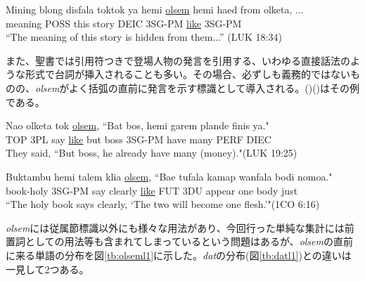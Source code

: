 \begin{exe}
  \ex\label{ex:olsemc}
  \gll Mining blong disfala toktok ya hemi \underline{olsem} hemi haed from olketa, ...\\
  meaning POSS this story DEIC 3SG-PM \underline{like} 3SG-PM \\
  \glt ``The meaning of this story is hidden from them...'' (LUK 18:34)
\end{exe}

また、聖書では引用符つきで登場人物の発言を引用する、いわゆる直接話法のような形式で台詞が挿入されることも多い。その場合、必ずしも義務的ではないものの、\textit{olsem}がよく括弧の直前に発言を示す標識として導入される。()()はその例である。

\begin{exe}
  \ex
  \gll Nao olketa tok \underline{olsem}, ``Bat bos, hemi garem plande finis ya."\\
  TOP 3PL say \underline{like} but boss 3SG-PM have many PERF DIEC\\
  \glt They said, ``But boss, he already have many (money)."(LUK 19:25)

  \ex\label{ex:talemolsem}
  \gll Buktambu hemi talem klia \underline{olsem}, ``Bae tufala kamap wanfala bodi nomoa." \\
  book-holy 3SG-PM say clearly \underline{like} FUT 3DU appear one body just\\
  \glt ``The holy book says clearly, `The two will become one flesh.'"(1CO 6:16)
\end{exe}

\textit{olsem}には従属節標識以外にも様々な用法があり、今回行った単純な集計には前置詞としての用法等も含まれてしまっているという問題はあるが、\textit{olsem}の直前に来る単語の分布を図\ref{tb:olseml1}に示した。\textit{dat}の分布(図\ref{tb:datl1})との違いは一見して2つある。

